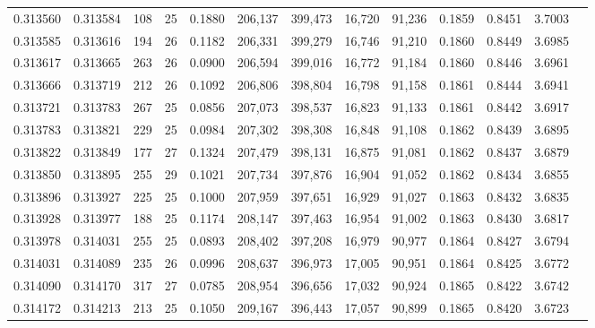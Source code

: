\begin{tabular}{rrrrrrrrrrrrr}
0.313560 & 0.313584 &   108 &  25 &                                     0.1880 & 206,137 & 399,473 &  16,720 &  91,236 & 0.1859 & 0.8451 & 3.7003 \\
0.313585 & 0.313616 &   194 &  26 &                                     0.1182 & 206,331 & 399,279 &  16,746 &  91,210 & 0.1860 & 0.8449 & 3.6985 \\
0.313617 & 0.313665 &   263 &  26 &                                     0.0900 & 206,594 & 399,016 &  16,772 &  91,184 & 0.1860 & 0.8446 & 3.6961 \\
0.313666 & 0.313719 &   212 &  26 &                                     0.1092 & 206,806 & 398,804 &  16,798 &  91,158 & 0.1861 & 0.8444 & 3.6941 \\
0.313721 & 0.313783 &   267 &  25 &                                     0.0856 & 207,073 & 398,537 &  16,823 &  91,133 & 0.1861 & 0.8442 & 3.6917 \\
0.313783 & 0.313821 &   229 &  25 &                                     0.0984 & 207,302 & 398,308 &  16,848 &  91,108 & 0.1862 & 0.8439 & 3.6895 \\
0.313822 & 0.313849 &   177 &  27 &                                     0.1324 & 207,479 & 398,131 &  16,875 &  91,081 & 0.1862 & 0.8437 & 3.6879 \\
0.313850 & 0.313895 &   255 &  29 &                                     0.1021 & 207,734 & 397,876 &  16,904 &  91,052 & 0.1862 & 0.8434 & 3.6855 \\
0.313896 & 0.313927 &   225 &  25 &                                     0.1000 & 207,959 & 397,651 &  16,929 &  91,027 & 0.1863 & 0.8432 & 3.6835 \\
0.313928 & 0.313977 &   188 &  25 &                                     0.1174 & 208,147 & 397,463 &  16,954 &  91,002 & 0.1863 & 0.8430 & 3.6817 \\
0.313978 & 0.314031 &   255 &  25 &                                     0.0893 & 208,402 & 397,208 &  16,979 &  90,977 & 0.1864 & 0.8427 & 3.6794 \\
0.314031 & 0.314089 &   235 &  26 &                                     0.0996 & 208,637 & 396,973 &  17,005 &  90,951 & 0.1864 & 0.8425 & 3.6772 \\
0.314090 & 0.314170 &   317 &  27 &                                     0.0785 & 208,954 & 396,656 &  17,032 &  90,924 & 0.1865 & 0.8422 & 3.6742 \\
0.314172 & 0.314213 &   213 &  25 &                                     0.1050 & 209,167 & 396,443 &  17,057 &  90,899 & 0.1865 & 0.8420 & 3.6723 \\

\end{tabular}

